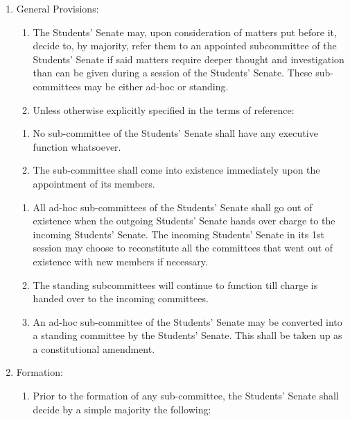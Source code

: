\begin{enumerate}
\def\labelenumi{\arabic{enumi}.}
\item
  General Provisions:

  \begin{enumerate}
  \def\labelenumii{\alph{enumii}.}
  \item
    The Students' Senate may, upon consideration of matters put before
    it, decide to, by majority, refer them to an appointed subcommittee
    of the Students' Senate if said matters require deeper thought and
    investigation than can be given during a session of the Students'
    Senate. These sub-committees may be either ad-hoc or standing.
  \item
    Unless otherwise explicitly specified in the terms of reference:
  \end{enumerate}

  \begin{enumerate}
  \def\labelenumii{\arabic{enumii}.}
  \item
    No sub-committee of the Students' Senate shall have any executive
    function whatsoever.
  \item
    The sub-committee shall come into existence immediately upon the
    appointment of its members.
  \end{enumerate}

  \begin{enumerate}
  \def\labelenumii{\alph{enumii}.}
  \setcounter{enumii}{2}
  \item
    All ad-hoc sub-committees of the Students' Senate shall go out of
    existence when the outgoing Students' Senate hands over charge to
    the incoming Students' Senate. The incoming Students' Senate in its
    1st session may choose to reconstitute all the committees that went
    out of existence with new members if necessary.
  \item
    The standing subcommittees will continue to function till charge is
    handed over to the incoming committees.
  \item
    An ad-hoc sub-committee of the Students' Senate may be converted
    into a standing committee by the Students' Senate. This shall be
    taken up as a constitutional amendment.
  \end{enumerate}
\item
  Formation:

  \begin{enumerate}
  \def\labelenumii{\alph{enumii}.}
  \itemsep1pt\parskip0pt
  \item
    Prior to the formation of any sub-committee, the Students' Senate
    shall decide by a simple majority the following:
  \end{enumerate}


\end{enumerate}
